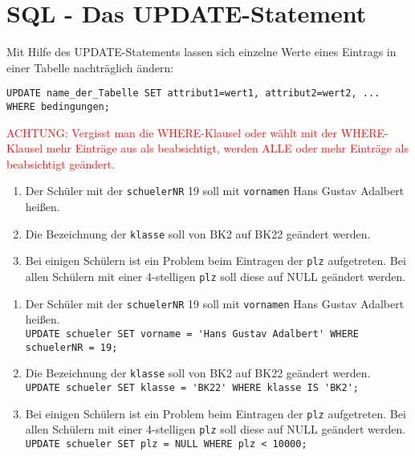 \section[UPDATE-Statement]{SQL - Das UPDATE-Statement}
Mit Hilfe des UPDATE-Statements lassen sich einzelne Werte eines Eintrags in einer Tabelle nachträglich ändern:
\begin{tcolorbox}[title=UPDATE-Statement]
	\lstinline[breaklines=true]!UPDATE name_der_Tabelle SET attribut1=wert1, attribut2=wert2, ... WHERE bedingungen;!
\end{tcolorbox}
\textcolor{red}{ACHTUNG: Vergisst man die WHERE-Klausel oder wählt mit der WHERE-Klausel mehr Einträge aus als beabsichtigt, werden ALLE oder mehr Einträge als beabsichtigt geändert.}
\begin{Exercise}[title={Ändere folgende Einträge aus der Datenbank:}, label=Update]
	\begin{enumerate}
		\item Der Schüler mit der \lstinline!schuelerNR! 19 soll mit \lstinline!vornamen! Hans Gustav Adalbert heißen.
		\item Die Bezeichnung der \lstinline!klasse! soll von BK2 auf BK22 geändert werden.
		\item Bei einigen Schülern ist ein Problem beim Eintragen der \lstinline!plz! aufgetreten. Bei allen Schülern mit einer 4-stelligen \lstinline!plz! soll diese auf NULL geändert werden.
	\end{enumerate}
\end{Exercise}
\begin{Answer}[ref=Update]
	\begin{enumerate}
		\item Der Schüler mit der \lstinline!schuelerNR! 19 soll mit \lstinline!vornamen! Hans Gustav Adalbert heißen.\\
		\lstinline!UPDATE schueler SET vorname = 'Hans Gustav Adalbert' WHERE schuelerNR = 19;!
		\item Die Bezeichnung der \lstinline!klasse! soll von BK2 auf BK22 geändert werden.\\
		\lstinline!UPDATE schueler SET klasse = 'BK22' WHERE klasse IS 'BK2';!
		\item Bei einigen Schülern ist ein Problem beim Eintragen der \lstinline!plz! aufgetreten. Bei allen Schülern mit einer 4-stelligen \lstinline!plz! soll diese auf NULL geändert werden.\\
		\lstinline!UPDATE schueler SET plz = NULL WHERE plz < 10000;!
	\end{enumerate}
\end{Answer}
